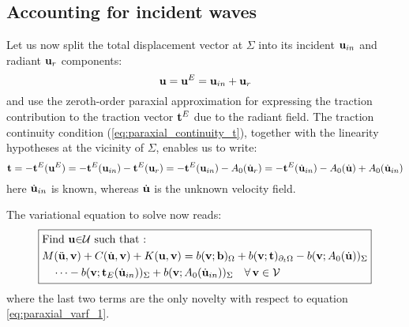 \subsection{Accounting for incident waves}
%
Let us now split the total displacement vector at $\Sigma$ into its incident ${\bf{u}}_{in}$ and radiant ${\bf{u}}_{r}$ components:
%
\begin{equation}
{\bf{u}}={\bf{u}}^{E}={\bf{u}}_{in}+{\bf{u}}_{r}
\end{equation}
%
and use the zeroth-order paraxial approximation for expressing the traction contribution to the traction vector ${\bf t}^{E}$ due to the radiant field. The traction continuity condition (\ref{eq:paraxial_continuity_t}),
together with the linearity hypotheses at the vicinity of $\Sigma$, enables us to write:
%
\begin{equation}
{\bf t}=-{\bf t}^{E}({\bf{u}}^{E})=-{\bf t}^{E}({\bf{u}}_{in})-{\bf t}^{E}({\bf{u}}_{r})=-{\bf t}^{E}({\bf{u}}_{in})-A_{0}(\dot{{\bf{u}}}_{r})=-{\bf t}^{E}(\dot{{\bf{u}}}_{in})-A_{0}(\dot{{\bf{u}}})+A_{0}(\dot{{\bf{u}}}_{in})
\end{equation}
%
here $\dot{{\bf{u}}}_{in}$ is known, whereas $\dot{{\bf{u}}}$ is the unknown velocity field. 

The variational equation to solve now reads:
\begin{equation}
\boxed{\begin{aligned} & \text{Find \ensuremath{{\bf{u}}}\ensuremath{\in}\ensuremath{\mathcal{U}} such that : }\\
 & M(\ddot{{\bf{u}}},{\bf{v}})+C(\dot{{\bf{u}}},{\bf{v}})+K({\bf{u}},{\bf{v}})=b({\bf{v}};{\bf{b}})_{\Omega}+b({\bf{v}};{\bf t})_{\partial_{t}\Omega}-b({\bf{v}};A_{0}(\dot{{\bf{u}}}))_{\Sigma}\\
 & \quad\cdots-b({\bf{v}};{\bf t}_{E}(\dot{{\bf{u}}}_{in}))_{\Sigma}+b({\bf{v}};A_{0}(\dot{{\bf{u}}}_{in}))_{\Sigma}\quad\forall\,{\bf{v}}\in\mathcal{V}
\end{aligned}
}
\end{equation}
%
where the last two terms are the only novelty with respect to equation \eqref{eq:paraxial_varf_1}.
